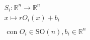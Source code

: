 \documentclass[preview]{standalone}
\begin{document}
\begin{align*}
S_i : \mathbb{R}^n \to \mathbb{R}^n \\ x \mapsto r O_i(x) + b_i \\\\ \text{ con } O_i \in \text{SO}(n), b_i \in \mathbb{R}^n
\end{align*}
\end{document}

